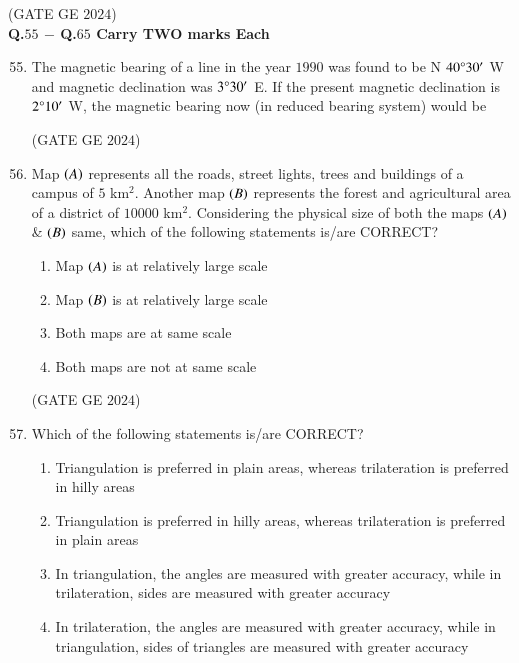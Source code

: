 \documentclass[journal,12pt,onecolumn]{IEEEtran}
\theoremstyle{remark}
\begin{document}
\hfill{(GATE GE $2024$)}
\bigskip
\\
\textbf{Q.$55$ $-$ Q.$65$ Carry TWO marks 
Each}\\
\begin{enumerate}
\setcounter{enumi}{54}
\item The magnetic bearing of a line in the year $1990$ was found to be N $40\degree30'$ W and magnetic declination was $3\degree30'$ E. If the present magnetic declination is $2\degree10'$ W, the magnetic bearing now (in reduced bearing system) would be
\begin{enumerate}
\end{enumerate}
\hfill{(GATE GE $2024$)}
\bigskip
\item Map $\left(A\right)$ represents all the roads, street lights, trees and buildings of a campus of $5$ km$^2$.
Another map $\left(B\right)$ represents the forest and agricultural area of a district of $10000$ km$^2$.
Considering the physical size of both the maps $\left(A\right)$ \& $\left(B\right)$ same, which of the following statements is/are CORRECT?
\begin{enumerate}
\item Map $\left(A\right)$ is at relatively large scale
\item Map $\left(B\right)$ is at relatively large scale
\item Both maps are at same scale
\item Both maps are not at same scale
\end{enumerate}
\hfill{(GATE GE $2024$)}
\bigskip
\item Which of the following statements is/are CORRECT?
\begin{enumerate}
\item Triangulation is preferred in plain areas, whereas trilateration is preferred in hilly areas
\item Triangulation is preferred in hilly areas, whereas trilateration is preferred in plain areas
\item In triangulation, the angles are measured with greater accuracy, while in trilateration, sides are measured with greater accuracy
\item In trilateration, the angles are measured with greater accuracy, while in triangulation, sides of triangles are measured with greater accuracy

\end{enumerate}
\end{enumerate}
\end{document}
